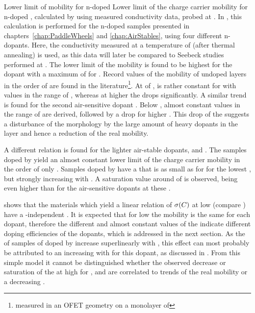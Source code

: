 {Lower limit of mobility for n-doped \CS}
{Lower limit of the charge carrier mobility \mobLL for n-doped \CS, calculated by  using measured conductivity data, probed at \T[40].}
%
In , this calculation is performed for the n-doped \CS samples presented in chapters~\ref{chap:PaddleWheels} and \ref{chap:AirStables}, using four different n-dopants. Here, the conductivity measured at a temperature of \T[40] (after thermal annealing) is used, as this data will later be compared to Seebeck studies performed at \Tm[40].
%
The lower limit of the mobility \mobLL is found to be highest for the dopant \CrPd with a maximum of \mobLL[0.90] for \C[0.005].
Record values of the mobility of undoped \CS layers in the order of \mob[5] are found in the literature\cite{Itaka2006}\footnote{measured in an OFET geometry on a monolayer of \pen}.
At \CLongs of , \mobLL is rather constant for \CrPd with values in the range of \mobLL[0.50], whereas at higher \C the \mobLL drops significantly.
A similar trend is found for the second air-sensitive dopant \WPd. Below \C[0.150], almost constant values in the range of \mobLL[0.15] are derived, followed by a drop for higher \CLongs.
This drop of the \mobLL suggests a disturbance of the morphology by the large amount of heavy dopants in the layer and hence a reduction of the real mobility.

A different relation is found for the lighter air-stable dopants, \aob and \dmbi. The samples doped by \aob yield an almost constant lower limit of the charge carrier mobility in the order of only \mobLL[9E-3].
Samples doped by \dmbi have a \mobLL that is as small as for \aob for the lowest \C, but strongly increasing with \C. A saturation value around of \mobLL[0.1] is observed, being even higher than for the air-sensitive dopants at these \CLongs.

 shows that the materials which yield a linear relation of $\c(\C)$ at low \CLongs (compare ) have a \C-independent \mobLL.
It is expected that for low \CLongs the mobility is the same for each dopant, therefore the different and almost constant values of the \mobLL indicate different doping efficiencies of the dopants, which is addressed in the next section. As the \cLongs of samples of \CS doped by \dmbi increase superlinearly with \CLong, this effect can most probably be attributed to an increasing \DopEff with \C for this dopant, as discussed in .
From this simple model it cannot be distinguished whether the observed decrease or saturation of the \mobLL at high \C for \CrPd, \WPd and \dmbi are correlated to trends of the real mobility or a decreasing \DopEff.

